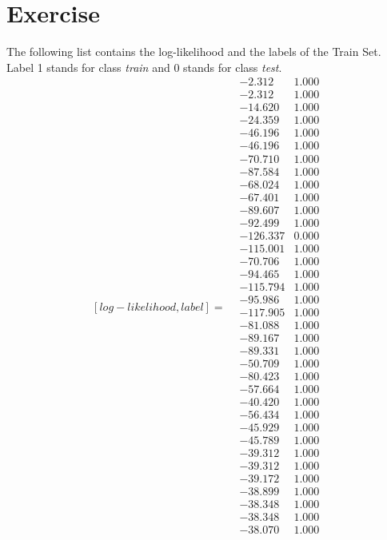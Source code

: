 \documentclass[conference]{IEEEtran}
\begin{document}
\section{Exercise}
The following list contains the log-likelihood and the labels of the Train Set. Label 1 stands for class \textit{train} and 0 stands for class \textit{test}.
$$
[log-likelihood, label] =
 \begin{smallmatrix}
 &-2.312 &1.000\\
 &-2.312 &1.000\\
 &-14.620 &1.000\\
 &-24.359 &1.000\\
 &-46.196 &1.000\\
 &-46.196 &1.000\\
 &-70.710 &1.000\\
 &-87.584 &1.000\\
 &-68.024 &1.000\\
 &-67.401 &1.000\\
 &-89.607 &1.000\\
 &-92.499 &1.000\\
 &-126.337 &0.000\\
 &-115.001 &1.000\\
 &-70.706 &1.000\\
 &-94.465 &1.000\\
 &-115.794 &1.000\\
 &-95.986 &1.000\\
 &-117.905 &1.000\\
 &-81.088 &1.000\\
 &-89.167 &1.000\\
 &-89.331 &1.000\\
 &-50.709 &1.000\\
 &-80.423 &1.000\\
 &-57.664 &1.000\\
 &-40.420 &1.000\\
 &-56.434 &1.000\\
 &-45.929 &1.000\\
 &-45.789 &1.000\\
 &-39.312 &1.000\\
 &-39.312 &1.000\\
 &-39.172 &1.000\\
 &-38.899 &1.000\\
 &-38.348 &1.000\\
 &-38.348 &1.000\\
 &-38.070 &1.000\\

\end{smallmatrix}$$
\end{document}
